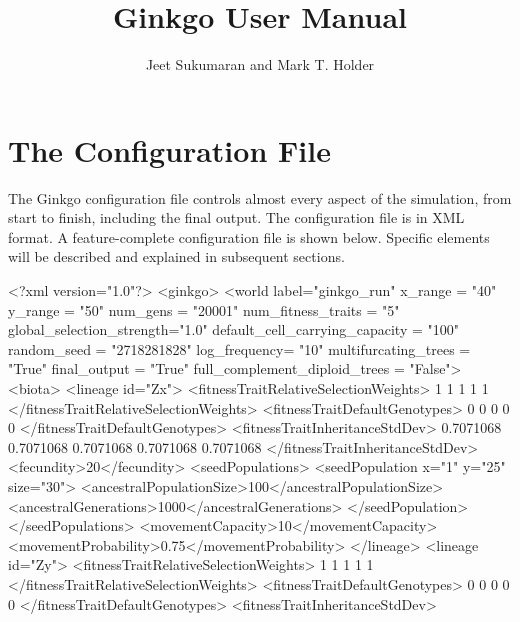 \documentclass[11pt]{article}
\title{Ginkgo User Manual}
\author{Jeet Sukumaran and Mark T. Holder}
\date{}                                           %
\begin{document}
\maketitle

\part{The Configuration File}

The Ginkgo configuration file controls almost every aspect of the simulation, from start to finish, including the final output.
The configuration file is in XML format.
A feature-complete configuration file is shown below.
Specific elements will be described and explained in subsequent sections.
\begin{ginkgoxml}
<?xml version="1.0"?>
<ginkgo>
    <world label="ginkgo_run"
           x_range = "40" 
           y_range = "50" 
           num_gens = "20001" 
           num_fitness_traits = "5" 
           global_selection_strength="1.0"               
           default_cell_carrying_capacity = "100"       
           random_seed = "2718281828"
           log_frequency= "10"
           multifurcating_trees = "True"
           final_output = "True"
           full_complement_diploid_trees = "False">
        <biota>
            <lineage id="Zx">
                <fitnessTraitRelativeSelectionWeights>
                	1 1 1 1 1
                </fitnessTraitRelativeSelectionWeights>
                <fitnessTraitDefaultGenotypes>
                	0 0 0 0 0
                </fitnessTraitDefaultGenotypes>            
                <fitnessTraitInheritanceStdDev>
                	0.7071068 0.7071068 0.7071068 0.7071068 0.7071068
                </fitnessTraitInheritanceStdDev>
                <fecundity>20</fecundity>
                <seedPopulations>
                    <seedPopulation x="1" y="25" size="30">
                        <ancestralPopulationSize>100</ancestralPopulationSize>
                        <ancestralGenerations>1000</ancestralGenerations>
                    </seedPopulation>
                </seedPopulations>
                <movementCapacity>10</movementCapacity>
                <movementProbability>0.75</movementProbability>
            </lineage>            
            <lineage id="Zy">
                <fitnessTraitRelativeSelectionWeights>
                	1 1 1 1 1
                </fitnessTraitRelativeSelectionWeights>
                <fitnessTraitDefaultGenotypes>
                	0 0 0 0 0
                </fitnessTraitDefaultGenotypes>            
                <fitnessTraitInheritanceStdDev>

\end{ginkgoxml}
\end{document}
